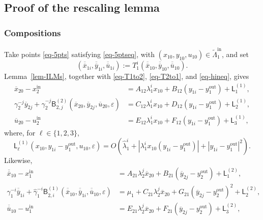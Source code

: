 \documentclass[11pt,a4paper]{article}
\theoremstyle{plain}
\theoremstyle{definition}
\theoremstyle{plain}
\numberwithin{equation}{section}
\begin{document}
\subsection{Proof of the rescaling lemma}

\subsubsection{Compositions}

Take points \eqref{eq-5pts} satisfying \eqref{eq-5ptseq}, with $(x_{10},y_{10},u_{10}) \in \widetilde{\Lambda}_1^\mathrm{in}$, and set
\[
(\overline{\overline{x}}_{1i},\overline{\overline{y}}_{1i},\overline{\overline{u}}_{1i})
:=
T_1^i(\overline{\overline{x}}_{10},\overline{\overline{y}}_{10},\overline{\overline{u}}_{10}).
\]
Lemma~\ref{lem-ILMs}, together with \eqref{eq-T1to2}, \eqref{eq-T2to1}, and \eqref{eq-hineq}, gives
\begin{equation}
\label{eq-FLGcomp}
\begin{aligned}
\overline{x}_{20} - x_2^\mathrm{in}
&=
A_{12}\lambda_1^i x_{10}
+ B_{12}(y_{1i} - y_1^\mathrm{out})
+
\mathsf{L}_1^{(1)},
\\
\gamma_2^{-j}\overline{y}_{2j}
+
\widehat{\gamma}_2^{-j}
\mathsf{B}_{2,j}^{(2)}(\overline{x}_{20},\overline{y}_{2j},\overline{u}_{20},\varepsilon)
&=
C_{12}\lambda_1^i x_{10}
+
D_{12}(y_{1i} - y_1^\mathrm{out})
+
\mathsf{L}_2^{(1)},
\\
\overline{u}_{20} - u_2^\mathrm{in}
&=
E_{12}\lambda_1^i x_{10}
+
F_{12}(y_{1i} - y_1^\mathrm{out})
+
\mathsf{L}_3^{(1)},
\end{aligned}
\end{equation}
where, for $\ell \in \{1,2,3\}$,
\[
\mathsf{L}_\ell^{(1)}(x_{10}, y_{1i} - y_1^\mathrm{out}, u_{10}, \varepsilon)
=
O\!\left(
\widehat{\lambda}_1^i
+
|\lambda_1^i x_{10}(y_{1i} - y_1^\mathrm{out})|
+
|y_{1i} - y_1^\mathrm{out}|^2
\right).
\]
Likewise,
\begin{equation}
\label{eq-SLGcomp}
\begin{aligned}
\overline{\overline{x}}_{10} - x_1^\mathrm{in}
&=
A_{21}\lambda_2^j\overline{x}_{20}
+
B_{21}(\overline{y}_{2j} - y_2^\mathrm{out})
+
\mathsf{L}_1^{(2)},
\\
\gamma_1^{-i}\overline{\overline{y}}_{1i}
+
\widehat{\gamma}_1^{-i}
\mathsf{B}_{2,i}^{(1)}(\overline{\overline{x}}_{10},\overline{\overline{y}}_{1i},\overline{\overline{u}}_{10},\varepsilon)
&=
\mu_1
+
C_{21}\lambda_2^j\overline{x}_{20}
+
G_{21}(\overline{y}_{2j} - y_2^\mathrm{out})^2
+
\mathsf{L}_2^{(2)},
\\
\overline{\overline{u}}_{10} - u_1^\mathrm{in}
&=
E_{21}\lambda_2^j\overline{x}_{20}
+
F_{21}(\overline{y}_{2j} - y_2^\mathrm{out})
+
\mathsf{L}_3^{(2)},
\end{aligned}
\end{equation}
\end{document}
